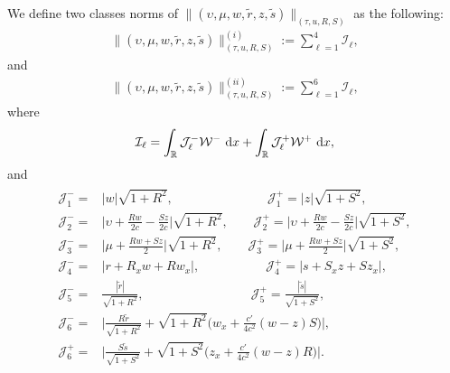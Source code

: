 \documentclass[11pt,reqno]{article}
\newcommand{\fr}{\frac}
\numberwithin{equation}{section}
\begin{document}
We define two classes norms of $\|(\upsilon, \mu, w, \tilde{r}, z, \tilde{s})\|_{(\tau, u, R, S)}$ as the following:
\begin{align}\label{6.17a}
\|(\upsilon, \mu, w, \tilde{r}, z, \tilde{s})\|_{(\tau, u, R, S)}^{(i)}:=\sum_{\ell=1}^4\mathcal{I}_\ell,
\end{align}
and
\begin{align}\label{6.17}
\|(\upsilon, \mu, w, \tilde{r}, z, \tilde{s})\|_{(\tau, u, R, S)}^{(ii)}:=\sum_{\ell=1}^6\mathcal{I}_\ell,
\end{align}
where
\begin{align}\label{6.18}
\begin{split}
\mathcal{I}_\ell=\int_{\mathbb{R}}\mathcal{J}_{\ell}^-\mathcal{W}^-\ {\rm d}x +\int_{\mathbb{R}}\mathcal{J}_{\ell}^+\mathcal{W}^+\ {\rm d}x,
\end{split}
\end{align}
and
\begin{align}\label{6.19}
\begin{split}
\mathcal{J}_{1}^-=&|w|\sqrt{1+R^2},\qquad \qquad  \qquad \quad \ \
\mathcal{J}_{1}^+=|z|\sqrt{1+S^2}, \\
\mathcal{J}_{2}^-=&\Big|\upsilon +\fr{Rw}{2c}-\fr{Sz}{2c}\Big|\sqrt{1+R^2}, \qquad \mathcal{J}_{2}^+=\Big|\upsilon +\fr{Rw}{2c}-\fr{Sz}{2c}\Big|\sqrt{1+S^2},  \\
\mathcal{J}_{3}^-=&\Big|\mu +\fr{Rw+Sz}{2}\Big|\sqrt{1+R^2},\qquad
\mathcal{J}_{3}^+=\Big|\mu +\fr{Rw+Sz}{2}\Big|\sqrt{1+S^2},
\\
\mathcal{J}_{4}^-=&|r+R_xw+Rw_x|,\qquad \qquad \quad \ \mathcal{J}_{4}^+=|s+S_xz+Sz_x|, \\
\mathcal{J}_{5}^-=& \fr{|\tilde{r}|}{\sqrt{1+R^2}},\qquad \qquad \qquad \qquad   \ \ \mathcal{J}_{5}^+= \fr{|\tilde{s}|}{\sqrt{1+S^2}}, \\
\mathcal{J}_{6}^-=&\Big|\fr{R\tilde{r}}{\sqrt{1+R^2}} +\sqrt{1+R^2}\Big(w_x+\fr{c'}{4c^2}(w-z)S\Big)\Big|, \\ \mathcal{J}_{6}^+=&\Big|\fr{S\tilde{s}}{\sqrt{1+S^2}} +\sqrt{1+S^2}\Big(z_x+\fr{c'}{4c^2}(w-z)R\Big)\Big|.
\end{split}
\end{align}
\end{document}
